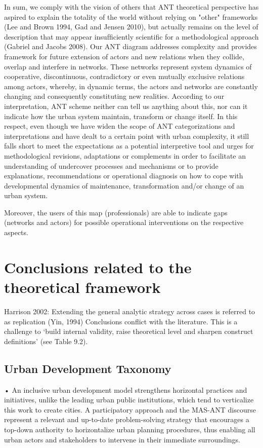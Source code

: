 \documentclass[11pt]{report}
\begin{document}
In sum, we comply with the vision of others that ANT theoretical perspective has aspired to explain the totality of the world without relying on "other" frameworks (Lee and Brown 1994, Gad and Jensen 2010), but actually remains on the level of description that may appear insufﬁciently scientiﬁc for a methodological approach (Gabriel and Jacobs 2008). Our ANT diagram addresses complexity and provides framework for future extension of actors and new relations when they collide, overlap and interfere in networks. These networks represent system dynamics of cooperative, discontinuous, contradictory or even mutually exclusive relations among actors, whereby, in dynamic terms, the actors and networks are constantly changing and consequently constituting new realities. According to our interpretation, ANT scheme neither can tell us anything about this, nor can it indicate how the urban system maintain, transform or change itself. In this respect, even though we have widen the scope of ANT categorizations and interpretations and have dealt to a certain point with urban complexity, it still falls short to meet the expectations as a potential interpretive tool and urges for methodological revisions, adaptations or complements in order to facilitate an understanding of undercover processes and mechanisms or to provide explanations, recommendations or operational diagnosis on how to cope with developmental dynamics of maintenance, transformation and/or change of an urban system.

Moreover, the users of this map (professionals) are able to indicate gaps (networks and actors) for possible operational interventions on the respective aspects. 

\section{Conclusions related to the theoretical framework}

Harrison 2002:
Extending the general analytic strategy across cases is referred to as replication (Yin, 1994)
Conclusions conflict with the literature. This is a challenge to
‘build internal validity, raise theoretical level and sharpen construct definitions’ (see Table 9.2).

\subsection{Urban Development Taxonomy}

•	An inclusive urban development model strengthens horizontal practices and initiatives, unlike the leading urban public institutions, which tend to verticalize this work to create cities. A participatory approach and the MAS-ANT discourse represent a relevant and up-to-date problem-solving strategy that encourages a top-down authority to horizontalize urban planning procedures, thus enabling all urban actors and stakeholders to intervene in their immediate surroundings. 
\end{document}
